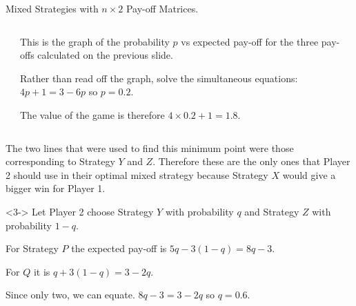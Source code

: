 \documentclass[8pt]{beamer}
\begin{document}
\begin{frame}{Mixed Strategies with $n\times 2$ Pay-off Matrices.}
	

\begin{columns}
\begin{column}{.4\linewidth}
\end{column}
\begin{column}{.6\linewidth}
This is the graph of the probability $p$ vs expected pay-off for the three pay-offs calculated on the previous slide.

Rather than read off the graph, solve the simultaneous equations: $4p+1=3-6p$ so  $p=0.2$.

The value of the game is therefore  $4\times 0.2+1=1.8$.
\end{column}
\end{columns}

\alert<2>{The two lines that were used to find this minimum point were those corresponding to Strategy $Y$ and  $Z$. Therefore these are the only ones that Player 2 should use in their optimal mixed strategy because Strategy  $X$ would give a bigger win for Player 1.}

\begin{solution}<3->
	Let Player 2 choose Strategy $Y$ with probability $q$ and Strategy $Z$ with probability $1-q$.

	For Strategy  $P$ the expected pay-off is  $5q-3(1-q)=8q-3 $.

	For $Q$ it is  $q+3(1-q)=3-2q $.

	Since only two, we can equate. $8q-3=3-2q$ so  $q=0.6$.

\end{solution}
\end{frame}
\end{document}
